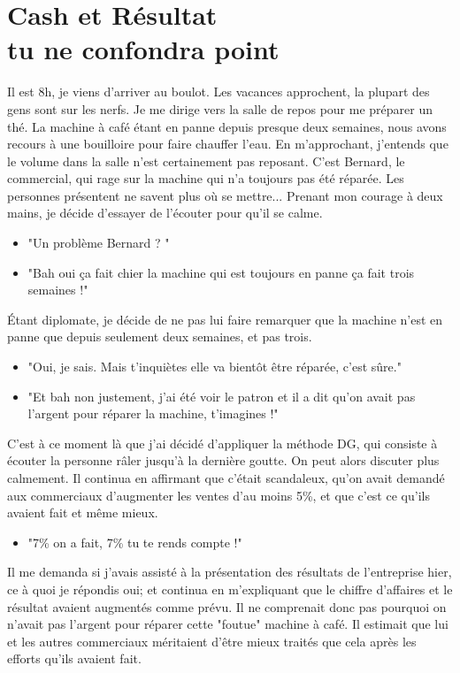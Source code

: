 
\chapter{Cash et Résultat \\ tu ne confondra point}


Il est 8h, je viens d'arriver au boulot.
Les vacances approchent, la plupart des gens sont sur les nerfs. 
Je me dirige vers la salle de repos pour me préparer un thé. 
La machine à café étant en panne depuis presque deux semaines, 
nous avons recours à une bouilloire pour faire chauffer l'eau.
En m'approchant, j'entends que le volume dans la salle n'est 
certainement pas reposant. C'est Bernard, le commercial, 
qui rage sur la machine qui n'a toujours pas été réparée. 
Les personnes présentent ne savent plus où se mettre... 
Prenant mon courage à deux mains, je décide d'essayer de 
l'écouter pour qu'il se calme.
\begin{itemize}
  \item "Un problème Bernard ? "
  \item "Bah oui ça fait chier la machine qui est toujours en 
  panne ça fait trois semaines !"
\end{itemize}
Étant diplomate, je décide de ne pas lui faire remarquer que 
la machine n'est en panne que depuis seulement deux semaines, et pas 
trois.
\begin{itemize}
  \item "Oui, je sais. Mais t'inquiètes elle va bientôt être 
  réparée, c'est sûre."
  \item "Et bah non justement, j'ai été voir le patron et il 
  a dit qu'on avait pas l'argent pour réparer la machine, t'imagines !"
\end{itemize}
C'est à ce moment là que j'ai décidé d'appliquer la méthode DG, 
qui consiste à écouter la personne râler jusqu'à la dernière 
goutte. On peut alors discuter plus calmement. 
Il continua en affirmant que c'était scandaleux, qu'on avait 
demandé aux commerciaux d'augmenter les ventes d'au 
moins 5\%, et que c'est ce qu'ils avaient fait et même 
mieux.
\begin{itemize}
  \item "7\% on a fait, 7\% tu te rends compte !"
\end{itemize}
Il me demanda si j'avais assisté à la présentation des 
résultats de l'entreprise hier, ce à quoi je répondis oui; et 
continua en m'expliquant que le chiffre d'affaires et le 
résultat avaient augmentés comme prévu. 
Il ne comprenait donc pas pourquoi on n'avait pas l'argent 
pour réparer cette "foutue" machine à café. 
Il estimait que lui et les autres commerciaux méritaient 
d'être mieux traités que cela après les efforts qu'ils avaient 
fait.

